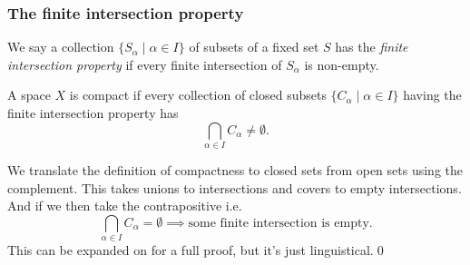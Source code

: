 \documentclass{article}
\begin{document}
\subsubsection{The finite intersection property}
We say a collection $ \{S_\alpha\mid \alpha \in I\} $ of subsets of a fixed set $ S $ has the \textit{finite intersection property} if every finite intersection of $ S_\alpha $ is non-empty.
\begin{theorem}
	A space $ X $ is compact if every collection of closed subsets $ \{C_\alpha\mid \alpha \in I\} $ having the finite intersection property has
	\[
		\bigcap_{\alpha \in I} C_\alpha \ne \emptyset.
	\]
\end{theorem}
\pf We translate the definition of compactness to closed sets from open sets using the complement. This takes unions to intersections and covers to empty intersections. And if we then take the contrapositive i.e.
\[
	\bigcap_{\alpha \in I} C_\alpha  = \emptyset \implies \text{some finite intersection is empty}.
\]
This can be expanded on for a full proof, but it's just linguistical.\qed
\end{document}
